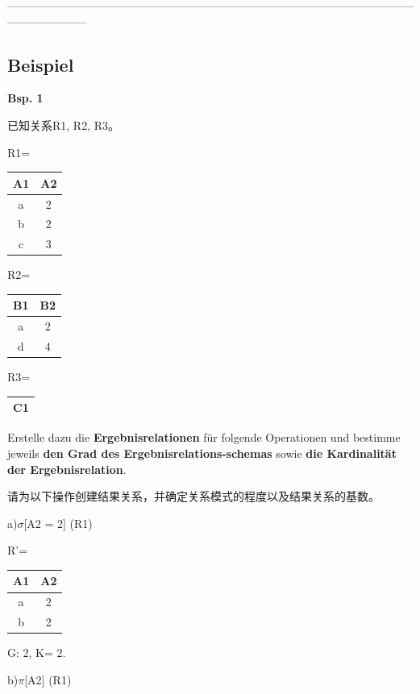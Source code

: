 \documentclass[fleqn]{article}
\begin{document}
\noindent---------------------------------------------------------------------------------------------------------------------------------

\subsection{Beispiel}

\noindent\textbf{Bsp. 1}

已知关系R1, R2, R3。

\begin{center}
    R1=\begin{tabular}{|c|c|}
        \hline
        A1&A2\\
        \hline
        a&2\\
        b&2\\
        c&3\\
        \hline
    \end{tabular}
    R2=\begin{tabular}{|c|c|}
        \hline
        B1&B2\\
        \hline
        a&2\\
        d&4\\
        \hline
    \end{tabular}
    R3=\begin{tabular}{|c|}
        \hline
        C1\\
        \hline
    \end{tabular}
\end{center}

Erstelle dazu die \textbf{Ergebnisrelationen} für folgende Operationen 
und bestimme jeweils \textbf{den Grad des Ergebnisrelations-schemas} sowie 
\textbf{die Kardinalität der Ergebnisrelation}.

请为以下操作创建结果关系，并确定关系模式的程度以及结果关系的基数。

a)$\sigma$[A2 = 2] (R1)

\begin{center}
    R'=\begin{tabular}{|c|c|}
        \hline
        A1&A2\\
        \hline
        a&2\\
        b&2\\
        \hline
    \end{tabular}

    G: 2, K= 2.
\end{center}

b)$\pi$[A2] (R1)
\end{document}
